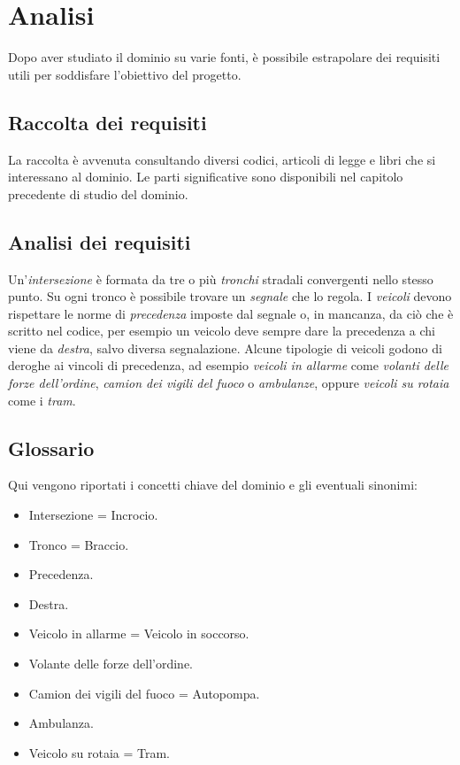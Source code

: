 \chapter{Analisi}

Dopo aver studiato il dominio su varie fonti, è possibile estrapolare dei requisiti utili per soddisfare l'obiettivo del progetto.

\section{Raccolta dei requisiti}
La raccolta è avvenuta consultando diversi codici, articoli di legge e libri che si interessano al dominio. Le parti significative sono disponibili nel capitolo precedente di studio del dominio.

\section{Analisi dei requisiti}
Un'\emph{intersezione} è formata da tre o più \emph{tronchi} stradali convergenti nello stesso punto. Su ogni tronco è possibile trovare un \emph{segnale} che lo regola. I \emph{veicoli} devono rispettare le norme di \emph{precedenza} imposte dal segnale o, in mancanza, da ciò che è scritto nel codice, per esempio un veicolo deve sempre dare la precedenza a chi viene da \emph{destra}, salvo diversa segnalazione. Alcune tipologie di veicoli godono di deroghe ai vincoli di precedenza, ad esempio \emph{veicoli in allarme} come \emph{volanti delle forze dell'ordine}, \emph{camion dei vigili del fuoco} o \emph{ambulanze}, oppure \emph{veicoli su rotaia} come i \emph{tram}.

\section{Glossario}
Qui vengono riportati i concetti chiave del dominio e gli eventuali sinonimi:
\begin{itemize}
	\item Intersezione = Incrocio.
	\item Tronco = Braccio.
	\item Precedenza.
	\item Destra.
	\item Veicolo in allarme = Veicolo in soccorso.
	\item Volante delle forze dell'ordine.
	\item Camion dei vigili del fuoco = Autopompa.
	\item Ambulanza.
	\item Veicolo su rotaia = Tram.
\end{itemize}
